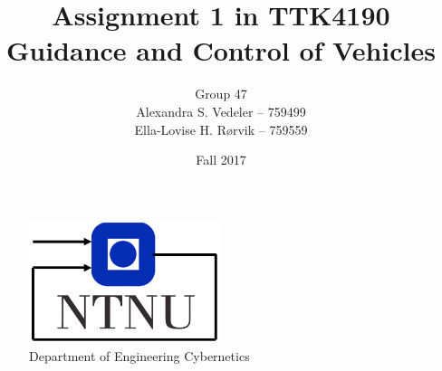 \documentclass[11pt,a4paper,english]{article}
\title{Assignment 1 in TTK4190  \\ Guidance and Control of Vehicles}
\author{Group 47 \\ Alexandra S. Vedeler -- 759499 
                 \\ Ella-Lovise H. Rørvik --  759559}
\date{Fall 2017}
\begin{document}

\begin{titlepage}
    \maketitle
    
    \begin{figure}
    \centering
    \includegraphics[width=0.5\textwidth]{figures/itk_ntnu}\\
    Department of Engineering Cybernetics
    \end{figure}
    \thispagestyle{empty}
\end{titlepage}



\thispagestyle{empty} %

\newpage
\tableofcontents
\thispagestyle{empty} %

\newpage
\setcounter{page}{1}
\setcounter{subsection}{2}

\newpage
%
%


%
%
%

\newpage
{}
\printbibliography
\label{sec:bibliography}
\end{document}
